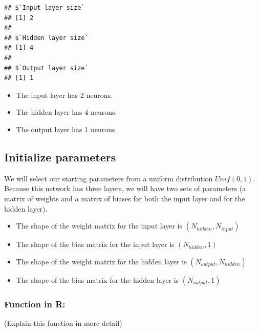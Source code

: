 \begin{verbatim}
## $`Input layer size`
## [1] 2
## 
## $`Hidden layer size`
## [1] 4
## 
## $`Output layer size`
## [1] 1
\end{verbatim}

\begin{itemize}
\tightlist
\item
  The input layer has 2 neurons.
\item
  The hidden layer has 4 neurons.
\item
  The output layer has 1 neurons.
\end{itemize}

\hypertarget{initialize-parameters}{%
\subsection{Initialize parameters}\label{initialize-parameters}}

We will select our starting parameters from a uniform distribution
\(Unif(0,1)\).\\
Because this network has three layers, we will have two sets of
parameters (a matrix of weights and a matrix of biases for both the
input layer and for the hidden layer).

\begin{itemize}
\tightlist
\item
  The shape of the weight matrix for the input layer is
  \((N_{hidden},N_{input})\)
\item
  The shape of the bias matrix for the input layer is \((N_{hidden},1)\)
\item
  The shape of the weight matrix for the hidden layer is
  \((N_{output},N_{hidden})\)
\item
  The shape of the bias matrix for the hidden layer is
  \((N_{output},1)\)
\end{itemize}

\hypertarget{function-in-r-1}{%
\subsubsection{Function in R:}\label{function-in-r-1}}

(Explain this function in more detail)

